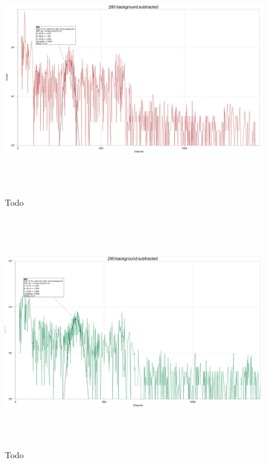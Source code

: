 \documentclass[fleqn]{article}
\begin{document}
  \begin{figure}[htbp]
    \includegraphics[height=10cm, width=18cm]{Five.JPG}
    \caption{
      Todo
    }
  \end{figure}

  \pagebreak

  \begin{figure}[htbp]
    \includegraphics[height=10cm, width=18cm]{Six.JPG}
    \caption{
      Todo
    }
  \end{figure}

  \pagebreak
\end{document}
